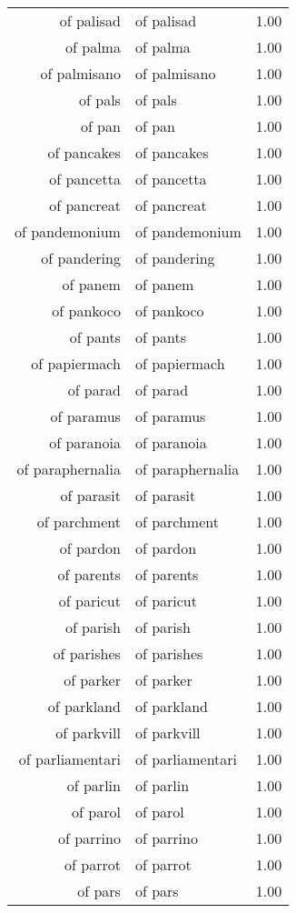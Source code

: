 \begin{table}[ht]
\begin{tabular}{rlr}
  of palisad & of palisad & 1.00 \\ 
  of palma & of palma & 1.00 \\ 
  of palmisano & of palmisano & 1.00 \\ 
  of pals & of pals & 1.00 \\ 
  of pan & of pan & 1.00 \\ 
  of pancakes & of pancakes & 1.00 \\ 
  of pancetta & of pancetta & 1.00 \\ 
  of pancreat & of pancreat & 1.00 \\ 
  of pandemonium & of pandemonium & 1.00 \\ 
  of pandering & of pandering & 1.00 \\ 
  of panem & of panem & 1.00 \\ 
  of pankoco & of pankoco & 1.00 \\ 
  of pants & of pants & 1.00 \\ 
  of papiermach & of papiermach & 1.00 \\ 
  of parad & of parad & 1.00 \\ 
  of paramus & of paramus & 1.00 \\ 
  of paranoia & of paranoia & 1.00 \\ 
  of paraphernalia & of paraphernalia & 1.00 \\ 
  of parasit & of parasit & 1.00 \\ 
  of parchment & of parchment & 1.00 \\ 
  of pardon & of pardon & 1.00 \\ 
  of parents & of parents & 1.00 \\ 
  of paricut & of paricut & 1.00 \\ 
  of parish & of parish & 1.00 \\ 
  of parishes & of parishes & 1.00 \\ 
  of parker & of parker & 1.00 \\ 
  of parkland & of parkland & 1.00 \\ 
  of parkvill & of parkvill & 1.00 \\ 
  of parliamentari & of parliamentari & 1.00 \\ 
  of parlin & of parlin & 1.00 \\ 
  of parol & of parol & 1.00 \\ 
  of parrino & of parrino & 1.00 \\ 
  of parrot & of parrot & 1.00 \\ 
  of pars & of pars & 1.00 \\ 

\end{tabular}
\end{table}
